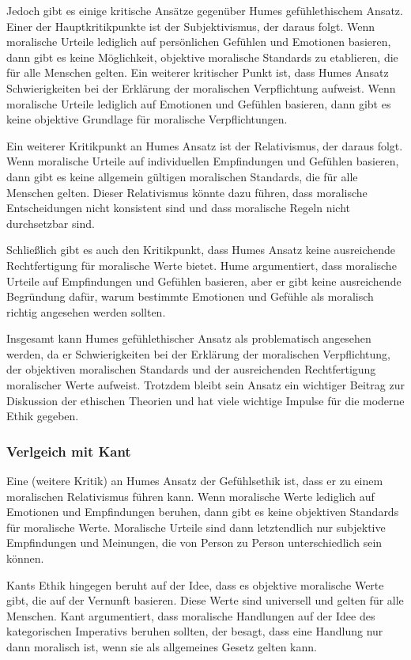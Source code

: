 \documentclass{article}
\begin{document}
Jedoch gibt es einige kritische Ansätze gegenüber Humes gefühlethischem Ansatz.
Einer der Hauptkritikpunkte ist der Subjektivismus, der daraus folgt. Wenn
moralische Urteile lediglich auf persönlichen Gefühlen und Emotionen basieren,
dann gibt es keine Möglichkeit, objektive moralische Standards zu etablieren,
die für alle Menschen gelten. Ein weiterer kritischer Punkt ist, dass Humes
Ansatz Schwierigkeiten bei der Erklärung der moralischen Verpflichtung aufweist.
Wenn moralische Urteile lediglich auf Emotionen und Gefühlen basieren, dann gibt
es keine objektive Grundlage für moralische Verpflichtungen.

Ein weiterer Kritikpunkt an Humes Ansatz ist der Relativismus, der daraus folgt.
Wenn moralische Urteile auf individuellen Empfindungen und Gefühlen basieren,
dann gibt es keine allgemein gültigen moralischen Standards, die für alle
Menschen gelten. Dieser Relativismus könnte dazu führen, dass moralische
Entscheidungen nicht konsistent sind und dass moralische Regeln nicht
durchsetzbar sind.

Schließlich gibt es auch den Kritikpunkt, dass Humes Ansatz keine ausreichende
Rechtfertigung für moralische Werte bietet. Hume argumentiert, dass moralische
Urteile auf Empfindungen und Gefühlen basieren, aber er gibt keine ausreichende
Begründung dafür, warum bestimmte Emotionen und Gefühle als moralisch richtig
angesehen werden sollten.

Insgesamt kann Humes gefühlethischer Ansatz als problematisch angesehen werden,
da er Schwierigkeiten bei der Erklärung der moralischen Verpflichtung, der
objektiven moralischen Standards und der ausreichenden Rechtfertigung
moralischer Werte aufweist. Trotzdem bleibt sein Ansatz ein wichtiger Beitrag
zur Diskussion der ethischen Theorien und hat viele wichtige Impulse für die
moderne Ethik gegeben.



 \subsubsection*{Verlgeich mit Kant}
Eine (weitere Kritik) an Humes Ansatz der Gefühlsethik ist, dass er zu einem
moralischen Relativismus führen kann. Wenn moralische Werte lediglich auf
Emotionen und Empfindungen beruhen, dann gibt es keine objektiven Standards für
moralische Werte. Moralische Urteile sind dann letztendlich nur subjektive
Empfindungen und Meinungen, die von Person zu Person unterschiedlich sein
können.

Kants Ethik hingegen beruht auf der Idee, dass es objektive moralische Werte
gibt, die auf der Vernunft basieren. Diese Werte sind universell und gelten für
alle Menschen. Kant argumentiert, dass moralische Handlungen auf der Idee des
kategorischen Imperativs beruhen sollten, der besagt, dass eine Handlung nur
dann moralisch ist, wenn sie als allgemeines Gesetz gelten kann.
\end{document}
